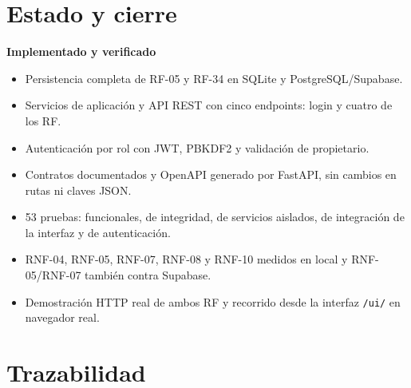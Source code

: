 \documentclass[11pt,a4paper]{article}
\newcommand{\code}[1]{\texttt{#1}}
\begin{document}
\section{Estado y cierre}

\textbf{Implementado y verificado}

\begin{itemize}
\item Persistencia completa de RF-05 y RF-34 en SQLite y PostgreSQL/Supabase.
\item Servicios de aplicación y API REST con cinco endpoints: login y cuatro
  de los RF.
\item Autenticación por rol con JWT, PBKDF2 y validación de propietario.
\item Contratos documentados y OpenAPI generado por FastAPI, sin cambios en
  rutas ni claves JSON.
\item 53 pruebas: funcionales, de integridad, de servicios aislados, de
  integración de la interfaz y de autenticación.
\item RNF-04, RNF-05, RNF-07, RNF-08 y RNF-10 medidos en local y RNF-05/RNF-07
  también contra Supabase.
\item Demostración HTTP real de ambos RF y recorrido desde la interfaz
  \code{/ui/} en navegador real.
\end{itemize}

\section{Trazabilidad}
\end{document}
